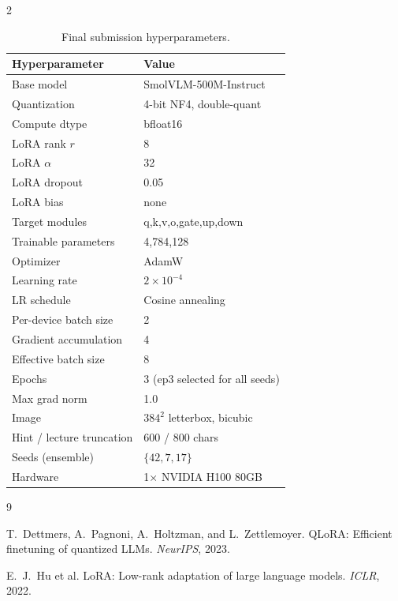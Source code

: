 \documentclass[11pt,a4paper]{article}
\begin{document}
\begin{multicols}{2}
\begin{table}[H]
\centering
\small
\setlength{\tabcolsep}{4pt}
\begin{tabular}{ll}
\toprule
\textbf{Hyperparameter} & \textbf{Value} \\
\midrule
Base model              & SmolVLM-500M-Instruct \\
Quantization            & 4-bit NF4, double-quant \\
Compute dtype           & bfloat16 \\
LoRA rank $r$           & 8 \\
LoRA $\alpha$           & 32 \\
LoRA dropout            & 0.05 \\
LoRA bias               & none \\
Target modules          & q,k,v,o,gate,up,down \\
Trainable parameters    & 4{,}784{,}128 \\
Optimizer               & AdamW \\
Learning rate           & $2\times10^{-4}$ \\
LR schedule             & Cosine annealing \\
Per-device batch size   & 2 \\
Gradient accumulation   & 4 \\
Effective batch size    & 8 \\
Epochs                  & 3 (ep3 selected for all seeds) \\
Max grad norm           & 1.0 \\
Image                   & $384^2$ letterbox, bicubic \\
Hint / lecture truncation & 600 / 800 chars \\
Seeds (ensemble)        & $\{42, 7, 17\}$ \\
Hardware                & 1$\times$ NVIDIA H100 80GB \\
\bottomrule
\end{tabular}
\caption{Final submission hyperparameters.}
\label{tab:hparams}
\end{table}

\begin{thebibliography}{9}
\small

T.~Dettmers, A.~Pagnoni, A.~Holtzman, and L.~Zettlemoyer.
QLoRA: Efficient finetuning of quantized LLMs.
\emph{NeurIPS}, 2023.

E.~J.~Hu et al.
LoRA: Low-rank adaptation of large language models.
\emph{ICLR}, 2022.


\end{thebibliography}
\end{multicols}
\end{document}
